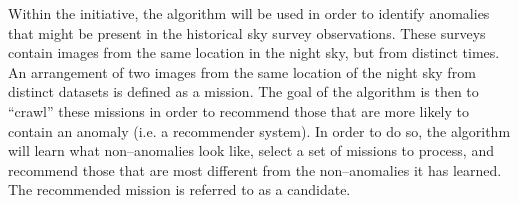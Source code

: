 Within the \vasco initiative, the \mlblink algorithm will be used in order to identify anomalies that might be present in the historical sky survey observations. These surveys contain images from the same location in the night sky, but from distinct times. An arrangement of two images from the same location of the night sky from distinct datasets is defined as a mission. The goal of the \mlblink algorithm is then to ``crawl'' these missions in order to recommend those that are more likely to contain an anomaly (i.e. a recommender system). In order to do so, the \mlblink algorithm will learn what non--anomalies look like,  select a set of missions to process, and recommend those that are most different from the non--anomalies it has learned. The recommended mission is referred to as a candidate.